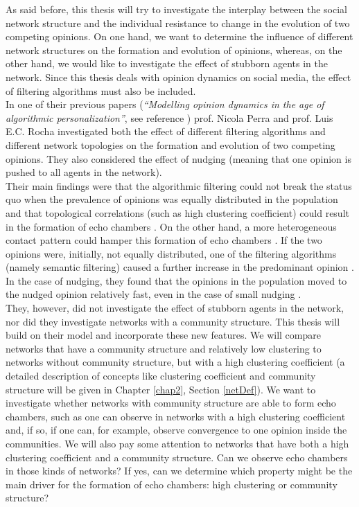 \documentclass[11 pt , letterpaper , twoside , openright]{book}
\begin{document}
As said before, this thesis will try to investigate the interplay between the social network structure and the individual resistance to change in the evolution of two competing opinions. On one hand, we want to determine the influence of different network structures on the formation and evolution of opinions, whereas, on the other hand, we would like to investigate the effect of stubborn agents in the network. Since this thesis deals with opinion dynamics on social media, the effect of filtering algorithms must also be included.\\ 
\newline
In one of their previous papers (\textit{``Modelling opinion dynamics in the age of algorithmic personalization''}, see reference \cite{Perra2019}) prof. Nicola Perra and prof. Luis E.C. Rocha investigated both the effect of different filtering algorithms and different network topologies on the formation and evolution of two competing opinions. They also considered the effect of nudging (meaning that one opinion is pushed to all agents in the network).\\ Their main findings were that the algorithmic filtering could not break the status quo when the prevalence of opinions was equally distributed in the population and that topological correlations (such as high clustering coefficient) could result in the formation of echo chambers \cite{Perra2019}. On the other hand, a more heterogeneous contact pattern could hamper this formation of echo chambers \cite{Perra2019}. If the two opinions were, initially, not equally distributed, one of the filtering algorithms (namely semantic filtering) caused a further increase in the predominant opinion \cite{Perra2019}. In the case of nudging, they found that the opinions in the population moved to the nudged opinion relatively fast, even in the case of small nudging \cite{Perra2019}.\\
They, however, did not investigate the effect of stubborn agents in the network, nor did they investigate networks with a community structure. This thesis will build on their model and incorporate these new features. We will compare networks that have a community structure and relatively low clustering to networks without community structure, but with a high clustering coefficient (a detailed description of concepts like clustering coefficient and community structure will be given in Chapter \ref{chap2}, Section \ref{netDef}). We want to investigate whether networks with community structure are able to form echo chambers, such as one can observe in networks with a high clustering coefficient and, if so, if one can, for example, observe convergence to one opinion inside the communities. We will also pay some attention to networks that have both a high clustering coefficient and a community structure. Can we observe echo chambers in those kinds of networks? If yes, can we determine which property might be the main driver for the formation of echo chambers: high clustering or community structure? \\
\end{document}
